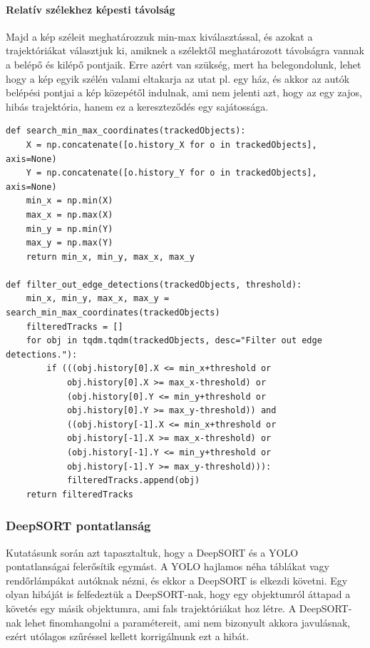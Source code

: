 \documentclass[12pt,a4paper]{article}
\begin{document}
\paragraph{Relatív szélekhez képesti távolság} Majd a kép széleit meghatározzuk min-max kiválasztással, és azokat a trajektóriákat választjuk ki, amiknek a szélektől meghatározott
távolságra vannak a belépő és kilépő pontjaik. Erre azért van szükség, mert ha belegondolunk, lehet hogy a kép egyik szélén valami eltakarja az utat pl. egy ház, és akkor az autók belépési pontjai a kép közepétől indulnak, ami nem jelenti azt, hogy az egy zajos, hibás trajektória, hanem ez a kereszteződés egy sajátossága.
\newpage
\begin{verbatim}
def search_min_max_coordinates(trackedObjects):
    X = np.concatenate([o.history_X for o in trackedObjects], axis=None)
    Y = np.concatenate([o.history_Y for o in trackedObjects], axis=None)
    min_x = np.min(X)
    max_x = np.max(X)
    min_y = np.min(Y)
    max_y = np.max(Y)
    return min_x, min_y, max_x, max_y

def filter_out_edge_detections(trackedObjects, threshold):
    min_x, min_y, max_x, max_y = search_min_max_coordinates(trackedObjects)
    filteredTracks = []
    for obj in tqdm.tqdm(trackedObjects, desc="Filter out edge detections."):
        if (((obj.history[0].X <= min_x+threshold or 
            obj.history[0].X >= max_x-threshold) or
            (obj.history[0].Y <= min_y+threshold or 
            obj.history[0].Y >= max_y-threshold)) and
            ((obj.history[-1].X <= min_x+threshold or 
            obj.history[-1].X >= max_x-threshold) or
            (obj.history[-1].Y <= min_y+threshold or 
            obj.history[-1].Y >= max_y-threshold))):
            filteredTracks.append(obj)
    return filteredTracks
\end{verbatim}

\subsubsection{DeepSORT pontatlanság}
Kutatásunk során azt tapasztaltuk, hogy a DeepSORT és a YOLO pontatlanságai felerősítik egymást. A YOLO hajlamos néha táblákat
vagy rendőrlámpákat autóknak nézni, és ekkor a DeepSORT is elkezdi követni. Egy olyan hibáját is felfedeztük a DeepSORT-nak, hogy
egy objektumról áttapad a követés egy másik objektumra, ami fals trajektóriákat hoz létre. A DeepSORT-nak lehet finomhangolni a
paramétereit, ami nem bizonyult akkora javulásnak, ezért utólagos szűréssel kellett korrigálnunk ezt a hibát.
\end{document}
